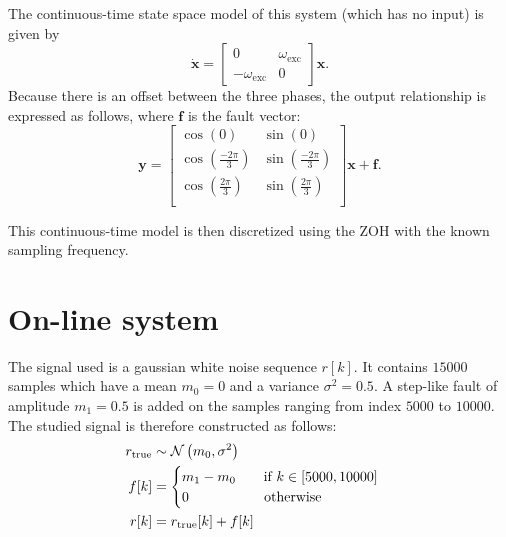 The continuous-time state space model of this system (which has no input) is given by
\begin{equation}
    \mathbf{\dot{x}} = \begin{bmatrix}
        0 & \omega_{\text{exc}}\\
        -\omega_{\text{exc}} & 0
    \end{bmatrix} \mathbf{x}.
\end{equation}
Because there is an offset between the three phases, the output relationship is expressed as follows, where $\mathbf{f}$ is the fault vector:
\begin{equation}
    \mathbf{y} = \begin{bmatrix}
        \cos(0) & \sin(0)\\
        \cos(\frac{-2 \pi}{3}) & \sin(\frac{-2 \pi}{3}) \\
        \cos(\frac{2 \pi}{3}) & \sin(\frac{2 \pi}{3}) \\
    \end{bmatrix} \mathbf{x} + \mathbf{f}.
\end{equation}

This continuous-time model is then discretized using the ZOH with the known sampling frequency.

\section{On-line system}
\label{annex:onlineSystem}

The signal used is a gaussian white noise sequence $r[k]$. It contains $15000$ samples which have a mean $m_0 = 0$ and a variance $\sigma^2 = 0.5$. A step-like fault of amplitude $m_1 = 0.5$ is added on the samples ranging from index $5000$ to $10000$. The studied signal is therefore constructed as follows:
\begin{align}
    r_{\text{true}} &\sim \mathcal{N}\left(m_0, \sigma^2\right)\\
    f[k] &= \begin{cases} m_1-m_0 \qquad \text{if } k \in [5000, 10000]\\
        0 \hspace{1.9cm} \text{otherwise} 
    \end{cases}\\
    r[k] &= r_{\text{true}}[k] + f[k]
\end{align}
